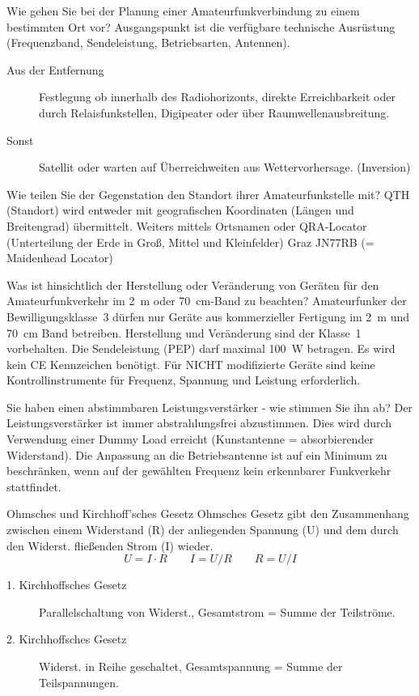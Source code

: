 \documentclass[avery5371,grid,frame,a4paper]{flashcards}
\newcommand{\card}[3]{
  \begin{flashcard}[{\chap} -- #1]{#2}#3\end{flashcard}
}
\newcommand\class[1]{{\footnotesize [Klassen: #1]}}
\begin{document}
\card{35}{Wie gehen Sie bei der Planung einer Amateurfunkverbindung zu einem bestimmten Ort vor?}{
  Ausgangspunkt ist die verfügbare technische Ausrüstung (Frequenzband, Sendeleistung, Betriebsarten, Antennen).

  \begin{description}
    \item[Aus der Entfernung] Festlegung ob innerhalb des Radiohorizonts, direkte Erreichbarkeit oder durch Relaisfunkstellen, Digipeater oder über Raumwellenausbreitung.
    \item[Sonst] Satellit oder warten auf Überreichweiten aus Wettervorhersage. (Inversion)
  \end{description}
}
\card{36}{Wie teilen Sie der Gegenstation den Standort ihrer Amateurfunkstelle mit?}{
  QTH (Standort) wird entweder mit geografischen Koordinaten (Längen und Breitengrad) übermittelt. Weiters mittels Ortsnamen oder QRA-Locator (Unterteilung der Erde in Groß, Mittel und Kleinfelder) Graz JN77RB (= Maidenhead Locator)
}
\card{37}{Was ist hinsichtlich der Herstellung oder Veränderung von Geräten für den Amateurfunkverkehr im 2~m oder 70~cm-Band zu beachten?}{
  Amateurfunker der Bewilligungsklasse~3 dürfen nur Geräte aus kommerzieller Fertigung im 2~m und 70~cm Band betreiben. Herstellung und Veränderung sind der Klasse~1 vorbehalten. Die Sendeleistung (PEP) darf maximal 100~W betragen. Es wird kein CE Kennzeichen benötigt. Für NICHT modifizierte Geräte sind keine  Kontrollinstrumente für Frequenz, Spannung und Leistung erforderlich.
}
\card{38}{Sie haben einen abstimmbaren Leistungsverstärker - wie stimmen Sie ihn ab?}{
  Der Leistungsverstärker ist immer abstrahlungsfrei abzustimmen. Dies wird durch Verwendung einer Dummy Load erreicht (Kunstantenne = absorbierender Widerstand). Die Anpassung an die Betriebsantenne ist auf ein Minimum zu beschränken, wenn auf der gewählten Frequenz kein erkennbarer Funkverkehr stattfindet.
}

\def\chap{Technische Grundlagen \class{1}}

\card{01}{Ohmsches und Kirchhoff’sches Gesetz}{\small
Ohmsches Gesetz  gibt den Zusammenhang zwischen einem Widerstand  (R) der anliegenden 
Spannung (U) und dem durch den Widerst. fließenden Strom (I) wieder.
\[ U = I \cdot R  \qquad  I = U / R \qquad R = U / I \]
\begin{description}
  \item[1. Kirchhoffsches Gesetz] Parallelschaltung von Widerst., Gesamtstrom = Summe der Teilströme.
  \item[2. Kirchhoffsches Gesetz] Widerst. in Reihe geschaltet, Gesamtspannung = Summe der Teilspannungen.
\end{description}}
\end{document}

